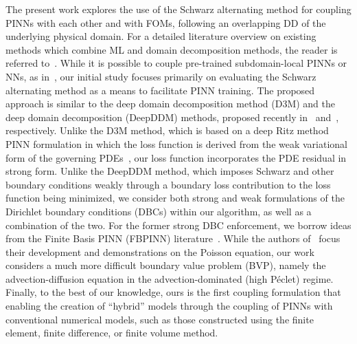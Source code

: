 \documentclass[oneside,final]{csri23}
\begin{document}
The present work explores the use of the Schwarz alternating method for coupling PINNs with each other and with FOMs, following an overlapping DD of the underlying physical domain. For a detailed literature overview on existing methods which combine ML and domain decomposition methods, the reader is referred to~\cite{WDS:Heinlein:2020}. While it is possible to couple pre-trained subdomain-local PINNs or NNs, as in~\cite{WDS:Wang:2022}, our initial study focuses primarily on evaluating the Schwarz alternating method as a means to facilitate PINN training.  The proposed approach is similar to the deep domain decomposition method (D3M)  and the deep domain decomposition (DeepDDM) methods, proposed recently in~\cite{WDS:LiD3M} and~\cite{WDS:LiDeepDDM}, respectively. Unlike the D3M method, which is based on a deep Ritz method PINN formulation in which the loss function is derived from the weak variational form of the governing PDEs~\cite{WDS:e2017deep, WDS:Sukumar:2022}, our loss function incorporates the PDE residual in strong form. Unlike the DeepDDM method, which imposes Schwarz and other boundary conditions weakly through a boundary loss contribution to the loss function being minimized, we consider both strong and weak formulations of the Dirichlet boundary conditions (DBCs) within our algorithm, as well as a combination of the two. For the former strong DBC enforcement, we borrow ideas from the Finite Basis PINN (FBPINN) literature~\cite{WDS:Moseley:2023, WDS:Dolean:2023}. While the authors of~\cite{WDS:LiD3M, WDS:LiDeepDDM} focus their development and demonstrations on the Poisson equation, our work considers a much more difficult boundary value problem (BVP), namely the advection-diffusion equation in the advection-dominated (high P\'{e}clet) regime.  Finally, to the best of our knowledge, ours is the first coupling formulation that enabling the creation of ``hybrid'' models through the coupling of PINNs with conventional numerical models, such as those constructed using the finite element, finite difference, or finite volume method. 
\end{document}
